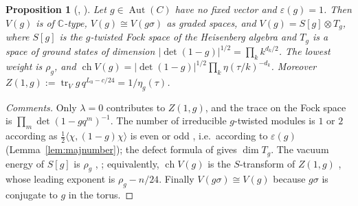 \documentclass[11pt]{amsart}
\newtheorem{proposition}[theorem]{Proposition}
\theoremstyle{definition}
\newcommand{\C}{\mathbb{C}}
\newcommand{\Aut}{\operatorname{Aut}}
\newcommand{\ch}{\operatorname{ch}}
\begin{document}
\begin{proposition}[{\cite[Thm.~4.2, Rem.~4.4]{BK}, \cite{Li}}]\label{prop:fpf}
Let $g\in\Aut(C)$ have no fixed vector and $\varepsilon(g)=1$. Then $V(g)$ is of $\C$-type,
$V(g)\cong V(g\sigma)$ as graded spaces, and $V(g)=S[g]\otimes T_g$, where $S[g]$ is the $g$-twisted Fock
space of the Heisenberg algebra and $T_g$ is a space of ground states of dimension
$|\det(1-g)|^{1/2}=\prod_kk^{d_k/2}$. The lowest weight is $\rho_g$, and
$\ch V(g)=|\det(1-g)|^{1/2}\prod_k\eta(\tau/k)^{-d_k}$. Moreover
$Z(1,g):=\operatorname{tr}_Vg\,q^{L_0-c/24}=1/\eta_g(\tau)$.
\end{proposition}

\begin{proof}[Comments]
Only $\lambda=0$ contributes to $Z(1,g)$, and the trace on the Fock space is $\prod_m\det(1-gq^m)^{-1}$.
The number of irreducible $g$-twisted modules is $1$ or $2$ according as $\tfrac12\langle\chi,
(1-g)\chi\rangle$ is even or odd \cite[Thm.~4.2]{BK}, i.e.\ according to $\varepsilon(g)$
(Lemma~\ref{lem:majnumber}); the defect formula of \cite{BK} gives $\dim T_g$. The vacuum energy of
$S[g]$ is $\rho_g$ \cite[Thm.~1.7.3]{FLM}, \cite{Lep,DL}; equivalently, $\ch V(g)$ is the
$S$-transform of $Z(1,g)$ \cite[Thm.~7.1]{DZ}, whose leading exponent is $\rho_g-n/24$. Finally
$V(g\sigma)\cong V(g)$ because $g\sigma$ is conjugate to $g$ in the torus.
\end{proof}
\end{document}
